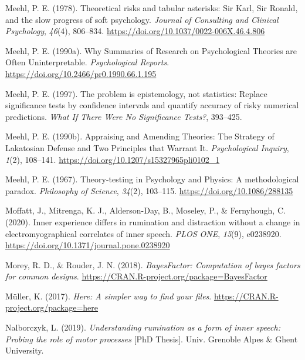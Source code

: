 \documentclass[
  english,
  man, donotrepeattitle,floatsintext]{apa6}
\newlength{\cslhangindent}
\newenvironment{cslreferences}%
  {\setlength{\parindent}{0pt}%
  \everypar{\setlength{\hangindent}{\cslhangindent}}\ignorespaces}%
  {\par}
\begin{document}
\begin{cslreferences}
\leavevmode\hypertarget{ref-meehl_theoretical_1978}{}%
Meehl, P. E. (1978). Theoretical risks and tabular asterisks: Sir Karl, Sir Ronald, and the slow progress of soft psychology. \emph{Journal of Consulting and Clinical Psychology}, \emph{46}(4), 806--834. \url{https://doi.org/10.1037/0022-006X.46.4.806}

\leavevmode\hypertarget{ref-meehl_why_1990}{}%
Meehl, P. E. (1990a). Why Summaries of Research on Psychological Theories are Often Uninterpretable. \emph{Psychological Reports}. \url{https://doi.org/10.2466/pr0.1990.66.1.195}

\leavevmode\hypertarget{ref-harlow_problem_1997}{}%
Meehl, P. E. (1997). The problem is epistemology, not statistics: Replace significance tests by confidence intervals and quantify accuracy of risky numerical predictions. \emph{What If There Were No Significance Tests?}, 393--425.

\leavevmode\hypertarget{ref-meehl_appraising_1990-1}{}%
Meehl, P. E. (1990b). Appraising and Amending Theories: The Strategy of Lakatosian Defense and Two Principles that Warrant It. \emph{Psychological Inquiry}, \emph{1}(2), 108--141. \url{https://doi.org/10.1207/s15327965pli0102_1}

\leavevmode\hypertarget{ref-meehl_theory-testing_1967}{}%
Meehl, P. E. (1967). Theory-testing in Psychology and Physics: A methodological paradox. \emph{Philosophy of Science}, \emph{34}(2), 103--115. \url{https://doi.org/10.1086/288135}

\leavevmode\hypertarget{ref-moffatt_inner_2020}{}%
Moffatt, J., Mitrenga, K. J., Alderson-Day, B., Moseley, P., \& Fernyhough, C. (2020). Inner experience differs in rumination and distraction without a change in electromyographical correlates of inner speech. \emph{PLOS ONE}, \emph{15}(9), e0238920. \url{https://doi.org/10.1371/journal.pone.0238920}

\leavevmode\hypertarget{ref-R-BayesFactor}{}%
Morey, R. D., \& Rouder, J. N. (2018). \emph{BayesFactor: Computation of bayes factors for common designs}. \url{https://CRAN.R-project.org/package=BayesFactor}

\leavevmode\hypertarget{ref-R-here}{}%
Müller, K. (2017). \emph{Here: A simpler way to find your files}. \url{https://CRAN.R-project.org/package=here}

\leavevmode\hypertarget{ref-nalborczyk_understanding_2019}{}%
Nalborczyk, L. (2019). \emph{Understanding rumination as a form of inner speech: Probing the role of motor processes} {[}PhD Thesis{]}. Univ. Grenoble Alpes \& Ghent University.


\end{cslreferences}
\end{document}
